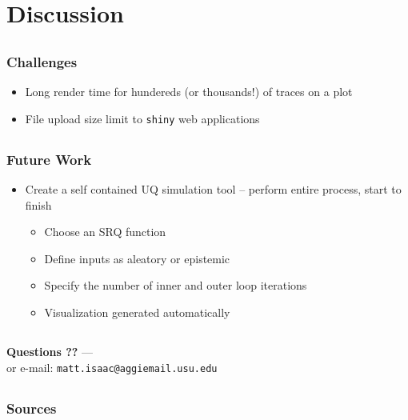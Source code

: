 \documentclass[handout, xcolor=dvipsnames]{beamer}
\begin{document}
\section{Discussion}  

\subsection{}
\begin{frame}
  \frametitle{Challenges}
  \begin{itemize}
    \item{Long render time for hundereds (or thousands!) of traces on a plot}
    \item{File upload size limit to {\tt shiny} web applications}
  \end{itemize}
\end{frame}

\subsection{}
\begin{frame}
  \frametitle{Future Work}
    \begin{itemize}
      \item{Create a self contained UQ simulation tool -- perform entire process, start to finish}
      \begin{itemize}
        \item{Choose an SRQ function}
        \item{Define inputs as aleatory or epistemic}
        \item{Specify the number of inner and outer loop iterations}
        \item{Visualization generated automatically}
      \end{itemize}
    \end{itemize}
\end{frame}
      
\subsection{}
\begin{frame}
	\frametitle{}
	\begin{center}
  {\large \bf Questions ??} --- \\[1cm]
    or e-mail: \tt{matt.isaac@aggiemail.usu.edu}
  \end{center}
\end{frame}

\subsection{}
\begin{frame}
	\frametitle{Sources}

	
	
  {\footnotesize
	}


\end{frame}
\end{document}
